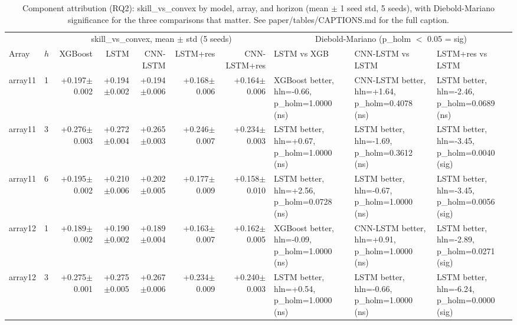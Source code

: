 \begin{table}[t]
  \centering
  \scriptsize
  \caption{Component attribution (RQ2): skill\_vs\_convex by model, array, and horizon (mean $\pm$ 1 seed std, 5 seeds), with Diebold-Mariano significance for the three comparisons that matter. See paper/tables/CAPTIONS.md for the full caption.}
  \label{tab:component-attribution}
  \begin{tabular}{ll rrrrr lll}
    \toprule
    & & \multicolumn{5}{c}{skill\_vs\_convex, mean $\pm$ std (5 seeds)} & \multicolumn{3}{c}{Diebold-Mariano (p\_holm $<$ 0.05 = sig)} \\
    \cmidrule(lr){3-7} \cmidrule(lr){8-10}
    Array & $h$ & XGBoost & LSTM & CNN-LSTM & LSTM+res & CNN-LSTM+res & LSTM vs XGB & CNN-LSTM vs LSTM & LSTM+res vs LSTM \\
    \midrule
    array11 & 1 & +0.197$\pm$0.002 & +0.194$\pm$0.002 & +0.194$\pm$0.006 & +0.168$\pm$0.006 & +0.164$\pm$0.006 & XGBoost better, hln=-0.66, p\_holm=1.0000 (ns) & CNN-LSTM better, hln=+1.64, p\_holm=0.4078 (ns) & LSTM better, hln=-2.46, p\_holm=0.0689 (ns) \\
    array11 & 3 & +0.276$\pm$0.003 & +0.272$\pm$0.004 & +0.265$\pm$0.003 & +0.246$\pm$0.007 & +0.234$\pm$0.003 & LSTM better, hln=+0.67, p\_holm=1.0000 (ns) & LSTM better, hln=-1.69, p\_holm=0.3612 (ns) & LSTM better, hln=-3.45, p\_holm=0.0040 (sig) \\
    array11 & 6 & +0.195$\pm$0.002 & +0.210$\pm$0.006 & +0.202$\pm$0.005 & +0.177$\pm$0.009 & +0.158$\pm$0.010 & LSTM better, hln=+2.56, p\_holm=0.0728 (ns) & LSTM better, hln=-0.67, p\_holm=1.0000 (ns) & LSTM better, hln=-3.45, p\_holm=0.0056 (sig) \\
    array12 & 1 & +0.189$\pm$0.002 & +0.190$\pm$0.002 & +0.189$\pm$0.004 & +0.163$\pm$0.007 & +0.162$\pm$0.005 & XGBoost better, hln=-0.09, p\_holm=1.0000 (ns) & CNN-LSTM better, hln=+0.91, p\_holm=1.0000 (ns) & LSTM better, hln=-2.89, p\_holm=0.0271 (sig) \\
    array12 & 3 & +0.275$\pm$0.001 & +0.275$\pm$0.005 & +0.267$\pm$0.006 & +0.234$\pm$0.009 & +0.240$\pm$0.003 & LSTM better, hln=+0.54, p\_holm=1.0000 (ns) & LSTM better, hln=-0.66, p\_holm=1.0000 (ns) & LSTM better, hln=-6.24, p\_holm=0.0000 (sig) \\

\end{tabular}
\end{table}
